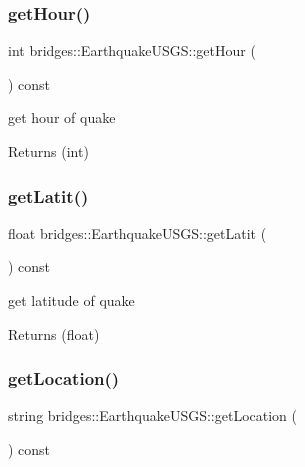 \subsubsection{\texorpdfstring{getHour()}{getHour()}}
{\footnotesize\ttfamily int bridges\+::\+Earthquake\+U\+S\+G\+S\+::get\+Hour (\begin{DoxyParamCaption}{ }\end{DoxyParamCaption}) const\hspace{0.3cm}{\ttfamily [inline]}}

get hour of quake

\begin{DoxyReturn}{Returns}
(int) 
\end{DoxyReturn}
\mbox{\label{classbridges_1_1_earthquake_u_s_g_s_aa781db898db1e1952820a5d80e8cc493}} 
\subsubsection{\texorpdfstring{getLatit()}{getLatit()}}
{\footnotesize\ttfamily float bridges\+::\+Earthquake\+U\+S\+G\+S\+::get\+Latit (\begin{DoxyParamCaption}{ }\end{DoxyParamCaption}) const\hspace{0.3cm}{\ttfamily [inline]}}

get latitude of quake

\begin{DoxyReturn}{Returns}
(float) 
\end{DoxyReturn}
\mbox{\label{classbridges_1_1_earthquake_u_s_g_s_a2083945bebd769c943f0d3ee4580f2ab}} 
\subsubsection{\texorpdfstring{getLocation()}{getLocation()}}
{\footnotesize\ttfamily string bridges\+::\+Earthquake\+U\+S\+G\+S\+::get\+Location (\begin{DoxyParamCaption}{ }\end{DoxyParamCaption}) const\hspace{0.3cm}{\ttfamily [inline]}}

